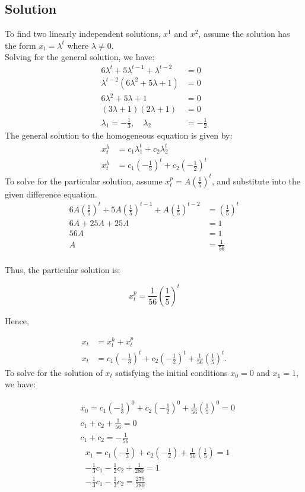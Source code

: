 \documentclass [a4paper]{article}
\begin{document}
\subsection*{Solution}
To find two linearly independent solutions, \(x^1\) and \(x^2\), assume the solution has the  form \(x_t = \lambda^t\) where \(\lambda \neq 0\).\\
Solving for the general solution, we have:
\begin{align*}
6\lambda^t + 5\lambda^{t-1} + \lambda^{t-2} &= 0 \\
\lambda^{t-2}(6\lambda^2 + 5\lambda + 1) &= 0 \\
6\lambda^2 + 5\lambda + 1 &= 0 \\
(3\lambda + 1)(2\lambda + 1) &= 0 \\
\lambda_1 = -\frac{1}{3}, \quad \lambda_2 &= -\frac{1}{2}
\end{align*}
The general solution to the homogeneous equation is given by:
\begin{align*}
x_t^h &= c_1\lambda_1^t + c_2\lambda_2^t  \\
x_t^h &= c_1 \left(-\frac{1}{3}\right)^t + c_2 \left( -\frac{1}{2} \right)^t
\end{align*}
To solve for the particular solution, assume \(x_t^p = A\left(\frac{1}{5}\right)^t\), and substitute into the given difference equation.
\begin{align*}
6A \left(\frac{1}{5}\right)^t + 5A \left(\frac{1}{5}\right)^{t-1} + A\left(\frac{1}{5}\right)^{t-2} &= \left(\frac{1}{5}\right)^t \\
6A + 25A + 25A &= 1 \\
56A &= 1 \\
A &= \frac{1}{56} \\
\end{align*}

Thus, the particular solution is:

\[
x_t^p = \frac{1}{56} \left(\frac{1}{5}\right)^t
\]

Hence,

\begin{align*}
x_t &= x_t^h + x_t^p \\
x_t &= c_1 \left(-\frac{1}{3}\right)^t + c_2 \left( -\frac{1}{2} \right)^t + \frac{1}{56} \left(\frac{1}{5}\right)^t.
\end{align*}
\newpage
To solve for the solution of \(x_t\) satisfying the initial conditions \(x_0 = 0\) and \(x_1 = 1\), we have:

\begin{align*}
&x_0 = c_1 \left(-\frac{1}{3}\right)^0 + c_2 \left( -\frac{1}{2} \right)^0 + \frac{1}{56} \left(\frac{1}{5}\right)^0 = 0 \\
&c_1 + c_2 + \frac{1}{56} = 0 \\
&c_1 + c_2 = -\frac{1}{56}
\end{align*}
\begin{align*}
&x_1 = c_1 \left(-\frac{1}{3}\right) + c_2 \left( -\frac{1}{2} \right) + \frac{1}{56} \left(\frac{1}{5}\right) = 1 \\
&-\frac{1}{3}c_1 -\frac{1}{2}c_2 + \frac{1}{280} = 1 \\
&-\frac{1}{3}c_1 -\frac{1}{2}c_2 = \frac{279}{280}
\end{align*}
\end{document}
